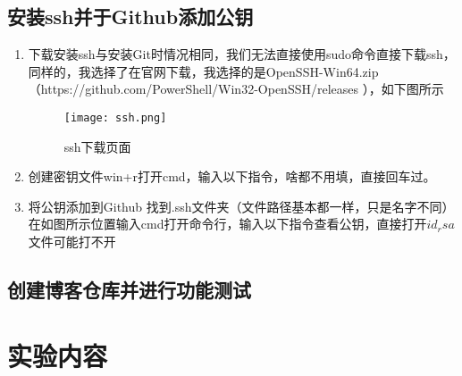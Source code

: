 \documentclass{zjureport}
\begin{document}
	\subsection{安装ssh并于Github添加公钥}
		\begin{enumerate}
			\item{下载安装ssh}与安装Git时情况相同，我们无法直接使用sudo命令直接下载ssh，同样的，我选择了在官网下载，我选择的是OpenSSH-Win64.zip（https://github.com/PowerShell/Win32-OpenSSH/releases ），如下图所示
			
			\begin{figure}[!htbp]
				\centering
				\texttt{[image: ssh.png]}
				\caption{ssh下载页面}
				\label{fig:dist}
			\end{figure}
			\item{创建密钥文件}win+r打开cmd，输入以下指令，啥都不用填，直接回车过。
			
		
			\item{将公钥添加到Github}
					找到.ssh文件夹（文件路径基本都一样，只是名字不同）
					在如图所示位置输入cmd打开命令行，输入以下指令查看公钥，直接打开$id_rsa$文件可能打不开
					
					
					
					\begin{figure}[htbp]
					\centering
				\end{figure}
				\begin{figure}[htbp]
					\centering
				\end{figure}
		\end{enumerate}
	\subsection{创建博客仓库并进行功能测试}
	
	
\section{实验内容}
\end{document}
